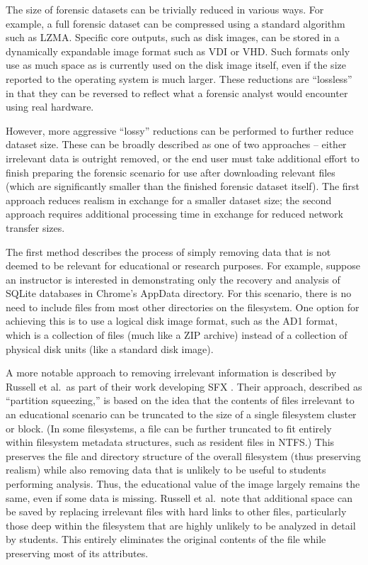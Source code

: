 \documentclass[letterpaper,12pt]{report}
\begin{document}
The size of forensic datasets can be trivially reduced in various ways.
For example, a full forensic dataset can be compressed using a standard
algorithm such as LZMA. Specific core outputs, such as disk images, can
be stored in a dynamically expandable image format such as VDI or VHD.
Such formats only use as much space as is currently used on the disk
image itself, even if the size reported to the operating system is much
larger. These reductions are ``lossless'' in that they can be reversed
to reflect what a forensic analyst would encounter using real hardware.

However, more aggressive ``lossy'' reductions can be performed to
further reduce dataset size. These can be broadly described as one of
two approaches -- either irrelevant data is outright removed, or the end
user must take additional effort to finish preparing the forensic
scenario for use after downloading relevant files (which are
significantly smaller than the finished forensic dataset itself). The
first approach reduces realism in exchange for a smaller dataset size;
the second approach requires additional processing time in exchange for
reduced network transfer sizes.

The first method describes the process of simply removing data that is
not deemed to be relevant for educational or research purposes. For
example, suppose an instructor is interested in demonstrating only the
recovery and analysis of SQLite databases in Chrome's AppData directory.
For this scenario, there is no need to include files from most other
directories on the filesystem. One option for achieving this is to use a
logical disk image format, such as the AD1 format, which is a collection
of files (much like a ZIP archive) instead of a collection of physical
disk units (like a standard disk image).

A more notable approach to removing irrelevant information is described
by Russell et al.~as part of their work developing SFX
\cite{russellForensicImageDescription2012}. Their approach,
described as ``partition squeezing,'' is based on the idea that the
contents of files irrelevant to an educational scenario can be truncated
to the size of a single filesystem cluster or block. (In some
filesystems, a file can be further truncated to fit entirely within
filesystem metadata structures, such as resident files in NTFS.) This
preserves the file and directory structure of the overall filesystem
(thus preserving realism) while also removing data that is unlikely to
be useful to students performing analysis. Thus, the educational value
of the image largely remains the same, even if some data is missing.
Russell et al.~note that additional space can be saved by replacing
irrelevant files with hard links to other files, particularly those deep
within the filesystem that are highly unlikely to be analyzed in detail
by students. This entirely eliminates the original contents of the file
while preserving most of its attributes.
\end{document}

